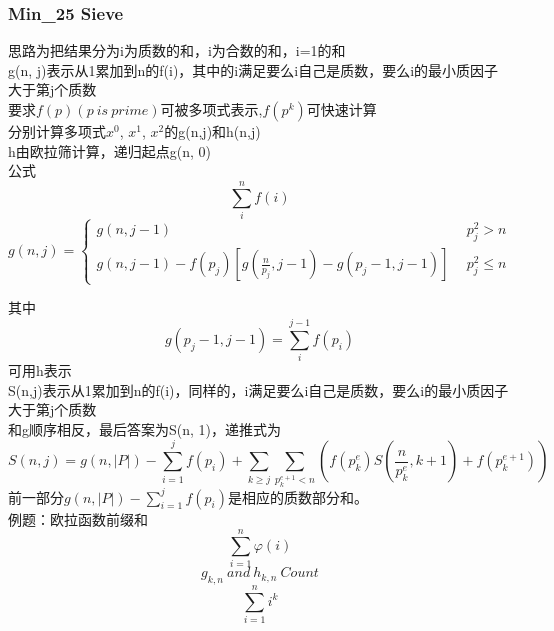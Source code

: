 \documentclass[10pt]{ctexart}
\begin{document}
{\subsubsection{Min\_25 Sieve}
思路为把结果分为i为质数的和，i为合数的和，i=1的和\\
g(n, j)表示从1累加到n的f(i)，其中的i满足要么i自己是质数，要么i的最小质因子大于第j个质数\\
要求$f(p)(p \ is\  prime)$可被多项式表示,$f(p^k)$可快速计算\\
分别计算多项式$x^0$, $x^1$, $x^2$的g(n,j)和h(n,j)\\
h由欧拉筛计算，递归起点g(n, 0)\\
公式
$$
\sum_i^n f(i)
$$
$$
g(n, j) = \left\{
\begin{aligned}
g(n, j - 1)\ \  & p_j^2 > n\\
g(n, j - 1) - f(p_j)[g(\frac{n}{p_j}, j - 1) - g(p_j - 1, j - 1)] \ \   & p_j^2 \leq n
\end{aligned}
\right.
$$

其中
$$
g(p_j - 1, j - 1) = \sum_i^{j - 1} f(p_i)
$$
可用h表示\\
S(n,j)表示从1累加到n的f(i)，同样的，i满足要么i自己是质数，要么i的最小质因子大于第j个质数\\
和g顺序相反，最后答案为S(n, 1)，递推式为
$$
S(n, j) = g(n, |P|) - \sum_{i = 1}^j f(p_i) + \sum_{k \geq j} \sum_{p_k^{e + 1} < n} (f(p_k^e)S(\frac{n}{p_k^e}, k + 1) + f(p_k^{e + 1}))
$$
前一部分$g(n, |P|) - \sum_{i = 1}^j f(p_i)$是相应的质数部分和。\\
例题：欧拉函数前缀和
$$
\sum_{i = 1}^n \varphi(i)
$$
$$
g_{k,n} \ and \ h_{k,n} \ Count
$$
$$
\sum_{i=1}^n i^k
$$

}
\end{document}
